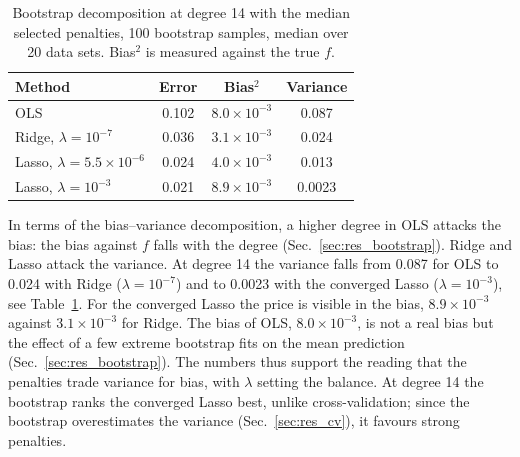 \begin{table}
    \centering
    \caption{Bootstrap decomposition at degree 14 with the median selected penalties, 100 bootstrap samples, median over 20 data sets. Bias$^2$ is measured against the true $f$.}
    \label{tab:i_bootstrap}
    \begin{tabular}{lccc}
        \toprule
        Method & Error & Bias$^2$ & Variance \\
        \midrule
        OLS                                     & 0.102  & $8.0\times10^{-3}$ & 0.087 \\
        Ridge, $\lambda = 10^{-7}$              & 0.036  & $3.1\times10^{-3}$ & 0.024 \\
        Lasso, $\lambda = 5.5\times10^{-6}$     & 0.024  & $4.0\times10^{-3}$ & 0.013 \\
        Lasso, $\lambda = 10^{-3}$              & 0.021  & $8.9\times10^{-3}$ & 0.0023 \\
        \bottomrule
    \end{tabular}
\end{table}

In terms of the bias--variance decomposition, a higher degree in OLS attacks the bias: the bias against $f$ falls with the degree (Sec.~\ref{sec:res_bootstrap}). Ridge and Lasso attack the variance. At degree 14 the variance falls from 0.087 for OLS to 0.024 with Ridge ($\lambda = 10^{-7}$) and to 0.0023 with the converged Lasso ($\lambda = 10^{-3}$), see Table~\ref{tab:i_bootstrap}. For the converged Lasso the price is visible in the bias, $8.9\times10^{-3}$ against $3.1\times10^{-3}$ for Ridge. The bias of OLS, $8.0\times10^{-3}$, is not a real bias but the effect of a few extreme bootstrap fits on the mean prediction (Sec.~\ref{sec:res_bootstrap}). The numbers thus support the reading that the penalties trade variance for bias, with $\lambda$ setting the balance. At degree 14 the bootstrap ranks the converged Lasso best, unlike cross-validation; since the bootstrap overestimates the variance (Sec.~\ref{sec:res_cv}), it favours strong penalties.
